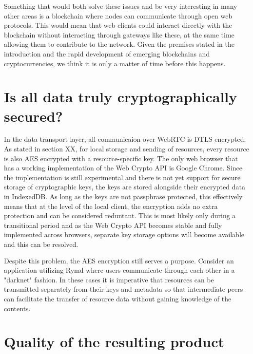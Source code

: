 Something that would both solve these issues and be very interesting in many other areas is a blockchain where nodes can communicate through open web protocols. This would mean that web clients could interact directly with the blockchain without interacting through gateways like these, at the same time allowing them to contribute to the network. Given the premises stated in the introduction and the rapid development of emerging blockchains and cryptocurrencies, we think it is only a matter of time before this happens.

\section{Is all data truly cryptographically secured?}
In the data transport layer, all communicaion over WebRTC is DTLS encrypted. As stated in section XX, for local storage and sending of resources, every resource is also AES encrypted with a resource-specific key. The only web browser that has a working implementation of the Web Crypto API is Google Chrome. Since the implementation is still experimental and there is not yet support for secure storage of cryptographic keys, the keys are stored alongside their encrypted data in IndexedDB. As long as the keys are not passphrase protected, this effectively means that at the level of the local client, the encryption adds no extra protection and can be considered reduntant. This is most likely only during a transitional period and as the Web Crypto API becomes stable and fully implemented across browsers, separate key storage options will become available and this can be resolved.

Despite this problem, the AES encryption still serves a purpose. Consider an application utilizing Rymd where users communicate through each other in a "darknet" fashion. In these cases it is imperative that resources can be transmitted separately from their keys and metadata so that intermediate peers can facilitate the transfer of resource data without gaining knowledge of the contents.

\section{Quality of the resulting product}


